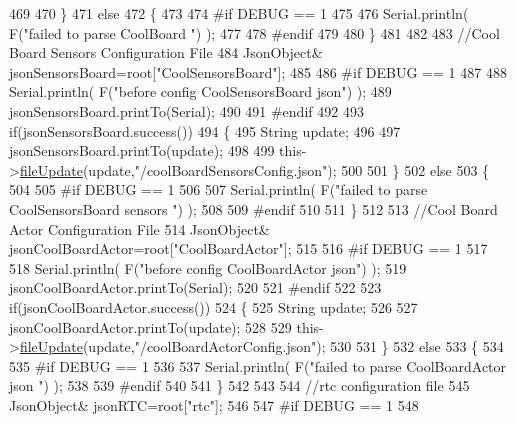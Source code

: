 \begin{DoxyCode}
469         
470     \}
471     \textcolor{keywordflow}{else}
472     \{
473     
474 \textcolor{preprocessor}{    #if DEBUG == 1 }
475 
476         Serial.println( F(\textcolor{stringliteral}{"failed to parse CoolBoard "}) );
477     
478 \textcolor{preprocessor}{    #endif}
479 
480     \}       
481 
482     
483     \textcolor{comment}{//Cool Board Sensors Configuration File}
484         JsonObject& jsonSensorsBoard=root[\textcolor{stringliteral}{"CoolSensorsBoard"}];
485 
486 \textcolor{preprocessor}{#if DEBUG == 1 }
487 
488     Serial.println( F(\textcolor{stringliteral}{"before config CoolSensorsBoard json"}) );
489     jsonSensorsBoard.printTo(Serial);
490 
491 \textcolor{preprocessor}{#endif }
492     
493     \textcolor{keywordflow}{if}(jsonSensorsBoard.success())
494     \{   
495         String update;
496     
497         jsonSensorsBoard.printTo(update);
498 
499         this->\hyperlink{class_cool_file_system_a13f2958f5b87757c31fc53797a30d23a}{fileUpdate}(update,\textcolor{stringliteral}{"/coolBoardSensorsConfig.json"});      
500 
501     \}
502     \textcolor{keywordflow}{else}
503     \{
504 
505 \textcolor{preprocessor}{    #if DEBUG == 1}
506 
507         Serial.println( F(\textcolor{stringliteral}{"failed to parse CoolSensorsBoard sensors "}) );   
508     
509 \textcolor{preprocessor}{    #endif}
510 
511     \}
512 
513     \textcolor{comment}{//Cool Board Actor Configuration File}
514         JsonObject& jsonCoolBoardActor=root[\textcolor{stringliteral}{"CoolBoardActor"}];
515 
516 \textcolor{preprocessor}{#if DEBUG == 1 }
517 
518     Serial.println( F(\textcolor{stringliteral}{"before config CoolBoardActor json"}) );
519     jsonCoolBoardActor.printTo(Serial);
520 
521 \textcolor{preprocessor}{#endif }
522     
523     \textcolor{keywordflow}{if}(jsonCoolBoardActor.success())
524     \{   
525         String update;
526     
527         jsonCoolBoardActor.printTo(update);
528 
529         this->\hyperlink{class_cool_file_system_a13f2958f5b87757c31fc53797a30d23a}{fileUpdate}(update,\textcolor{stringliteral}{"/coolBoardActorConfig.json"});        
530 
531     \}
532     \textcolor{keywordflow}{else}
533     \{
534 
535 \textcolor{preprocessor}{    #if DEBUG == 1}
536 
537         Serial.println( F(\textcolor{stringliteral}{"failed to parse CoolBoardActor json "}) );    
538     
539 \textcolor{preprocessor}{    #endif}
540 
541     \}
542 
543     
544     \textcolor{comment}{//rtc configuration file}
545         JsonObject& jsonRTC=root[\textcolor{stringliteral}{"rtc"}];
546 
547 \textcolor{preprocessor}{#if DEBUG == 1 }
548     

\end{DoxyCode}
